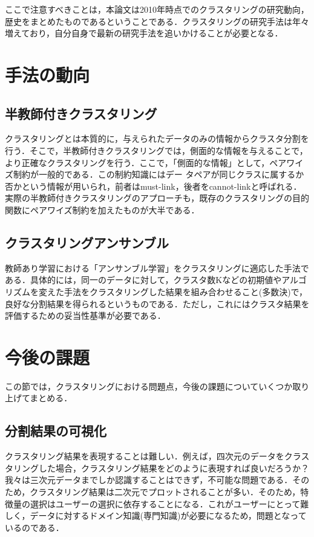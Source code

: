 \documentclass[10pt,onecolumn]{jsarticle}
\begin{document}
ここで注意すべきことは，本論文は2010年時点でのクラスタリングの研究動向，歴史をまとめたものであるということである．クラスタリングの研究手法は年々増えており，自分自身で最新の研究手法を追いかけることが必要となる．

\section{手法の動向}
\subsection{半教師付きクラスタリング}
クラスタリングとは本質的に，与えられたデータのみの情報からクラスタ分割を行う．そこで，半教師付きクラスタリングでは，側面的な情報を与えることで，より正確なクラスタリングを行う．ここで，「側面的な情報」として，ペアワイズ制約が一般的である．この制約知識にはデー タペアが同じクラスに属するか否かという情報が用いられ，前者はmust-link，後者をcannot-linkと呼ばれる．実際の半教師付きクラスタリングのアプローチも，既存のクラスタリングの目的関数にペアワイズ制約を加えたものが大半である．

\subsection{クラスタリングアンサンブル}
教師あり学習における「アンサンブル学習」をクラスタリングに適応した手法である．具体的には，同一のデータに対して，クラスタ数Kなどの初期値やアルゴリズムを変えた手法をクラスタリングした結果を組み合わせること(多数決)で，良好な分割結果を得られるというものである．ただし，これにはクラスタ結果を評価するための妥当性基準が必要である．

\section{今後の課題}
この節では，クラスタリングにおける問題点，今後の課題についていくつか取り上げてまとめる．
\subsection{分割結果の可視化}
クラスタリング結果を表現することは難しい．例えば，四次元のデータをクラスタリングした場合，クラスタリング結果をどのように表現すれば良いだろうか？我々は三次元データまでしか認識することはできず，不可能な問題である．そのため，クラスタリング結果は二次元でプロットされることが多い．そのため，特徴量の選択はユーザーの選択に依存することになる．これがユーザーにとって難しく，データに対するドメイン知識(専門知識)が必要になるため，問題となっているのである．
\end{document}
